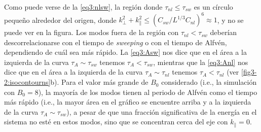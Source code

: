 Como puede verse de la \cref{eq3:nlsw}, la región donde
$\tau_{nl}\leq\tau_{sw}$ es un círculo pequeño alrededor del origen,
donde $k_\perp^2 + k_\parallel^2 \leq (C_{sw}/L^{1/3}C_{nl})^6 \approx
1$, y no se puede ver en la figura. Los modos fuera de la región con
$\tau_{nl}<\tau_{sw}$ deberían descorrelacionarse con el tiempo de
\textit{sweeping} o con el tiempo de Alfvén, dependiendo de cuál sea
más rápido. La \cref{eq3:Asw} nos dice que en el área a la izquierda de
la curva $\tau_A\sim\tau_{sw}$ tenemos $\tau_A<\tau_{sw}$, mientras
que la \cref{eq3:Anl} nos dice que en el área a la izquierda de la
curva $\tau_A\sim\tau_{nl}$ tenemos $\tau_A<\tau_{nl}$ (ver
\cref{fig3-2:isocontourns}b). Para el valor más grande de $B_0$
considerado (i.e., la simulación con $B_0=8$), la mayoría de los modos
tienen al periodo de Alfvén como el tiempo más rápido (i.e., la mayor
área en el gráfico se encuentre arriba y a la izquierda de la curva
$\tau_A \sim \tau_{sw}$), a pesar de que una fracción significativa de
la energía en el sistema no esté en estos modos, sino que se
concentran cerca del eje con $k_\parallel = 0$.

